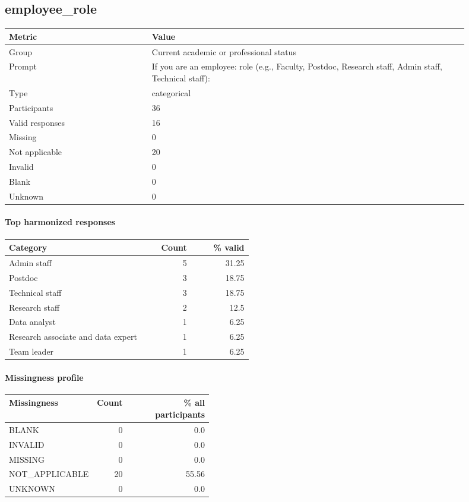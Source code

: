 \subsection*{employee\_role}
\begin{tabular}{p{0.28\linewidth}p{0.62\linewidth}}
\toprule
Metric & Value\\
\midrule
Group & Current academic or professional status\\
Prompt & If you are an employee: role (e.g., Faculty, Postdoc, Research staff, Admin staff, Technical staff):\\
Type & categorical\\
Participants & 36\\
Valid responses & 16\\
Missing & 0\\
Not applicable & 20\\
Invalid & 0\\
Blank & 0\\
Unknown & 0\\
\bottomrule
\end{tabular}

\paragraph{Top harmonized responses}
\begin{tabular}{p{0.56\linewidth}rr}
\toprule
Category & Count & \% valid\\
\midrule
Admin staff & 5 & 31.25\\
Postdoc & 3 & 18.75\\
Technical staff & 3 & 18.75\\
Research staff & 2 & 12.5\\
Data analyst & 1 & 6.25\\
Research associate and data expert & 1 & 6.25\\
Team leader & 1 & 6.25\\
\bottomrule
\end{tabular}

\paragraph{Missingness profile}
\begin{tabular}{p{0.40\linewidth}rr}
\toprule
Missingness & Count & \% all participants\\
\midrule
BLANK & 0 & 0.0\\
INVALID & 0 & 0.0\\
MISSING & 0 & 0.0\\
NOT\_APPLICABLE & 20 & 55.56\\
UNKNOWN & 0 & 0.0\\
\bottomrule
\end{tabular}

